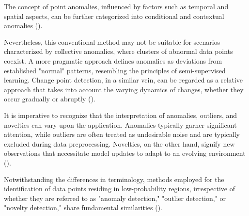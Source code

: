 The concept of point anomalies, influenced by factors such as temporal and spatial aspects, can be further categorized into conditional and contextual anomalies (\cite{Ruff2021}).

Nevertheless, this conventional method may not be suitable for scenarios characterized by collective anomalies, where clusters of abnormal data points coexist. A more pragmatic approach defines anomalies as deviations from established "normal" patterns, resembling the principles of semi-supervised learning. Change point detection, in a similar vein, can be regarded as a relative approach that takes into account the varying dynamics of changes, whether they occur gradually or abruptly (\cite{IGLESIASVAZQUEZ2023120994}).

It is imperative to recognize that the interpretation of anomalies, outliers, and novelties can vary upon the application. Anomalies typically garner significant attention, while outliers are often treated as undesirable noise and are typically excluded during data preprocessing. Novelties, on the other hand, signify new observations that necessitate model updates to adapt to an evolving environment (\cite{Ruff2021}).

Notwithstanding the differences in terminology, methods employed for the identification of data points residing in low-probability regions, irrespective of whether they are referred to as "anomaly detection," "outlier detection," or "novelty detection," share fundamental similarities (\cite{IGLESIASVAZQUEZ2023120994}).
